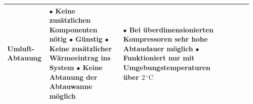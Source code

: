 \begin{table}
\begin{tabular}{p{3.8cm}p{5.6cm}p{5.6cm}lll}
 
\hline
\textbf{Umluft-Abtauung }
&
$\bullet$	Keine zusätzlichen Komponenten nötig			 
\newline
$\bullet$	Günstig										
\newline
$\bullet$	Keine zusätzlicher Wärmeeintrag ins System	  
\newline
$\bullet$	Keine Abtauung der Abtauwanne möglich	
&
$\bullet$ Bei überdimensionierten Kompressoren sehr hohe Abtaudauer möglich
\newline
$\bullet$ Funktioniert nur mit Umgebungstemperaturen über $ 2\,^{\circ}\mathrm{C} $
\\
\hline

\end{tabular}
\label{tab:Vor- und Nachteile}
\end{table}

